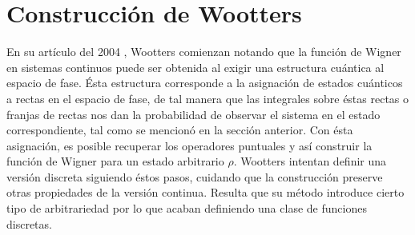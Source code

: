 \documentclass[a4paper]{report}
\DeclareMathOperator{\Z}{\mathbb{Z}}
\begin{document}




  \section{Construcción de Wootters}

  En su artículo del 2004 \cite{gibbons2004}, Wootters
  comienzan notando que la función de Wigner en sistemas
  continuos puede ser obtenida al exigir una estructura
  cuántica al espacio de fase. Ésta estructura corresponde a
  la asignación de estados cuánticos a rectas en el espacio
  de fase, de tal manera que las integrales sobre éstas
  rectas o franjas de rectas nos dan la probabilidad de
  observar el sistema en el estado correspondiente, tal como
  se mencionó en la sección anterior. Con ésta asignación,
  es posible recuperar los operadores puntuales y así
  construir la función de Wigner para un estado arbitrario
  $\rho$.  Wootters intentan definir una versión discreta
  siguiendo éstos pasos, cuidando que la construcción
  preserve otras propiedades de la versión continua.
  Resulta que su método introduce cierto tipo de
  arbitrariedad por lo que acaban definiendo una clase de
  funciones discretas.
\end{document}
